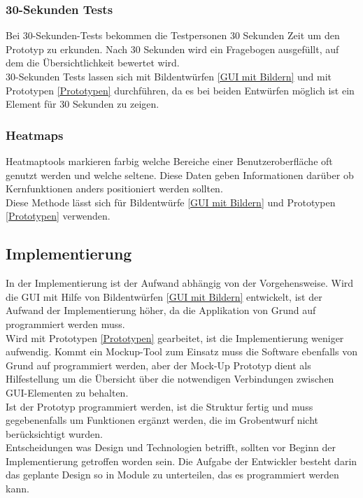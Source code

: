 \documentclass[12pt,a4paper]{article}
\begin{document}
\subsubsection{30-Sekunden Tests}
\label{30-Sekunden Tests}
Bei 30-Sekunden-Tests bekommen die Testpersonen 30 Sekunden Zeit um den Prototyp zu erkunden. Nach 30 Sekunden wird ein Fragebogen ausgefüllt, auf dem die Übersichtlichkeit bewertet wird\cite{vsimek2015usability}. \\
30-Sekunden Tests lassen sich mit Bildentwürfen \ref{GUI mit Bildern} und mit Prototypen \ref{Prototypen} durchführen, da es bei beiden Entwürfen möglich ist ein Element für 30 Sekunden zu zeigen.
\subsubsection{Heatmaps}
\label{Heatmaps}
Heatmaptools markieren farbig welche Bereiche einer Benutzeroberfläche oft genutzt werden und welche seltene\cite{10.1145/2470654.2466442}. Diese Daten geben Informationen darüber ob Kernfunktionen anders positioniert werden sollten.\\
Diese Methode lässt sich für Bildentwürfe \ref{GUI mit Bildern} und Prototypen \ref{Prototypen} verwenden.

\subsection{Implementierung}
In der Implementierung ist der Aufwand abhängig von der Vorgehensweise. Wird die \ac{GUI} mit Hilfe von Bildentwürfen \ref{GUI mit Bildern} entwickelt, ist der Aufwand der Implementierung höher, da die Applikation von Grund auf programmiert werden muss. \\
Wird mit Prototypen \ref{Prototypen} gearbeitet, ist die Implementierung weniger aufwendig. Kommt ein Mockup-Tool zum Einsatz muss die Software ebenfalls von Grund auf programmiert werden, aber der Mock-Up Prototyp dient als Hilfestellung um die Übersicht über die notwendigen Verbindungen zwischen \ac{GUI}-Elementen zu behalten.\\
Ist der Prototyp programmiert werden, ist die Struktur fertig und muss gegebenenfalls um Funktionen ergänzt werden, die im Grobentwurf nicht berücksichtigt wurden. \\
Entscheidungen was Design und Technologien betrifft, sollten vor Beginn der Implementierung getroffen worden sein. Die Aufgabe der Entwickler besteht darin das geplante Design so in Module zu unterteilen, das es programmiert werden kann\cite{rakos1990software}. 
\end{document}
